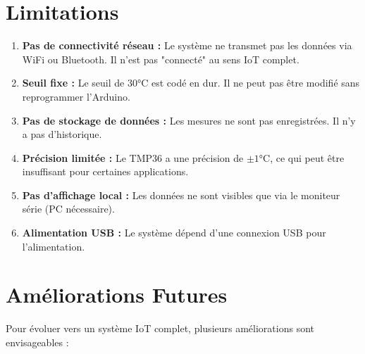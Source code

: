\documentclass[12pt, a4paper]{article}
\begin{document}
\section{Limitations}

\begin{enumerate}
    \item \textbf{Pas de connectivité réseau :} Le système ne transmet pas les données via WiFi ou Bluetooth. Il n'est pas "connecté" au sens IoT complet.
    \item \textbf{Seuil fixe :} Le seuil de 30°C est codé en dur. Il ne peut pas être modifié sans reprogrammer l'Arduino.
    \item \textbf{Pas de stockage de données :} Les mesures ne sont pas enregistrées. Il n'y a pas d'historique.
    \item \textbf{Précision limitée :} Le TMP36 a une précision de $\pm 1$°C, ce qui peut être insuffisant pour certaines applications.
    \item \textbf{Pas d'affichage local :} Les données ne sont visibles que via le moniteur série (PC nécessaire).
    \item \textbf{Alimentation USB :} Le système dépend d'une connexion USB pour l'alimentation.
\end{enumerate}

\section{Améliorations Futures}

Pour évoluer vers un système IoT complet, plusieurs améliorations sont envisageables :
\end{document}
